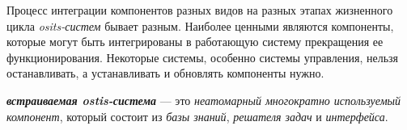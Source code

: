 Процесс интеграции компонентов разных видов на разных этапах жизненного цикла \textit{osits-систем} бывает разным. Наиболее ценными являются компоненты, которые могут быть интегрированы в работающую систему  прекращения ее функционирования. Некоторые системы, особенно системы управления, нельзя останавливать, а устанавливать и обновлять компоненты нужно.

\textbf{\textit{встраиваемая ostis-система}} --- это \textit{неатомарный многократно используемый компонент}, который состоит из \textit{базы знаний}, \textit{решателя задач} и \textit{интерфейса}.

